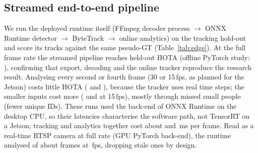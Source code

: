 \ifHaveEdge
\subsection{Streamed end-to-end pipeline}
We run the deployed runtime itself (FFmpeg decoder process $\rightarrow$ ONNX Runtime detector $\rightarrow$
ByteTrack $\rightarrow$ online analytics) on the tracking hold-out and score its tracks against the same
pseudo-GT (Table~\ref{tab:edge}). At the full frame rate the streamed pipeline reaches
held-out HOTA \EdHotaHiSOne{} (offline PyTorch study: \EdRefHota), confirming that export,
decoding and the online tracker reproduce the research result. Analysing every second or fourth frame (30 or
15\,fps, as planned for the Jetson) costs little HOTA (\EdHotaHiSTwo{} and \EdHotaHiSFour), because the tracker
uses real time steps; the smaller inputs cost more (\EdHotaMidSFour{} and \EdHotaLoSFour{} at 15\,fps),
mostly through missed small people (fewer unique IDs). These runs used the \texttt{\EdProvider} back-end of ONNX
Runtime on the desktop CPU, so their latencies characterise the software path, not TensorRT on a Jetson;
tracking and analytics together cost about \EdTrkMsHiSOne{} and \EdAnaMsHiSOne\,ms per frame.
\ifHaveEdgeLive
Read as a real-time RTSP camera at full rate (GPU PyTorch back-end), the runtime analysed
\EdLiveFrames{} of about \EdLivePublished{} frames at \EdLiveFps\,fps, dropping stale ones by design.
\fi

